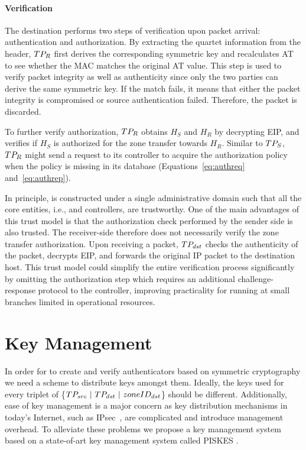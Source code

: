 

\paragraph{Verification}
The destination \tp performs two steps of verification upon packet arrival: authentication
and authorization. By extracting the quartet information from 
the header, $TP_R$ first derives the corresponding symmetric key and recalculates AT to
see whether the MAC matches the original AT value. This step is used to verify packet
integrity as well as authenticity since only the two parties can derive the same 
symmetric key. If the match fails, it means that either the packet integrity is compromised
or source authentication failed. Therefore, the packet is discarded.

To further verify authorization, $TP_R$ obtains $H_S$ and $H_R$ by decrypting EIP, and 
verifies if $H_S$ is authorized for the zone transfer towards $H_R$. Similar to $TP_S$,
$TP_R$ might send a request to its controller to acquire the authorization policy when
the policy is missing in its database (Equations~\ref{eq:authreq} and~\ref{eq:authrep}). 

In principle, \name is constructed under a single administrative domain such that all the 
core entities, i.e., \tps and controllers, are trustworthy. One of the main advantages of 
this trust model is that the authorization check performed by the sender side \tp is also 
trusted. The receiver-side \tp therefore does not necessarily verify the zone transfer 
authorization. Upon receiving a packet, $TP_{dst}$ checks the authenticity of the packet, 
decrypts EIP, and forwards the original IP packet to the destination host. This trust
model could simplify the entire verification process significantly by omitting the
authorization step which requires an additional challenge-response protocol to the 
controller, improving practicality for \tps running at small branches limited in 
operational resources. 

\section{Key Management}
\label{sec:keymanagement}

In order for \tps to create and verify authenticators based on symmetric cryptography 
we need a scheme to distribute keys amongst them. Ideally, the keys used for every 
triplet of \{$TP_{src}~|~TP_{dst}~|~zoneID_{dst}$\} should be different. Additionally, 
ease of key management is a major concern as key distribution mechanisms in today's 
Internet, such as IPsec~\cite{rfc2408,rfc2409,rfc4306}, are complicated and introduce 
management overhead. To alleviate these problems we propose a key management system 
based on a state-of-art key management system called PISKES \cite{rot2020piskes}.

